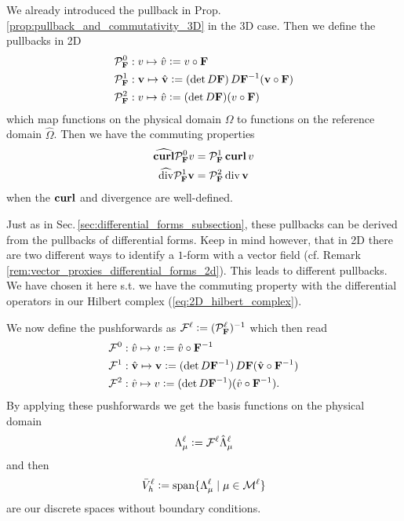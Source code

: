 \documentclass[../master_thesis.tex]{subfiles}
\begin{document}
We already introduced the pullback in Prop.\,\ref{prop:pullback_and_commutativity_3D} in the 3D case. 
Then we define the pullbacks in 2D
\begin{align*}
    &\mathcal{P}_\mathbf{F}^0: v \mapsto \hat{v} \vcentcolon= v \circ \mathbf{F}
    \\ &\mathcal{P}_\mathbf{F}^1: \mathbf{v} \mapsto \hat{\mathbf{v}} 
        \vcentcolon= (\det D\mathbf{F} )\,D\mathbf{F}^{-1} (\mathbf{v} \circ \mathbf{F})
    \\ &\mathcal{P}_\mathbf{F}^2: v \mapsto \hat{v} \vcentcolon= (\det D\mathbf{F}) (v\circ \mathbf{F})
\end{align*}
which map functions on the physical domain $\Omega$ to functions on the reference domain 
$\hat{\Omega}$. Then we have the commuting properties
\begin{align*}
    \widehat{\veccurl} \mathcal{P}_\mathbf{F}^0 v &= \mathcal{P}_\mathbf{F}^1 \veccurl v
    \\ \widehat{\diver} \mathcal{P}_\mathbf{F}^1 \mathbf{v} &= \mathcal{P}_\mathbf{F}^2 \diver \mathbf{v}
\end{align*}
when the $\veccurl$ and divergence are well-defined.
\begin{remark}
    Just as in Sec.\,\ref{sec:differential_forms_subsection}, 
    these pullbacks can be derived from the pullbacks of differential forms.
    Keep in mind however, that in 2D there are two different ways to identify a $1$-form 
    with a vector field (cf. Remark \ref{rem:vector_proxies_differential_forms_2d}). 
    This leads to different pullbacks. We have chosen it 
    here s.t. we have the commuting property with the differential operators in 
    our Hilbert complex (\ref{eq:2D_hilbert_complex}).
\end{remark}

We now define the pushforwards as 
$\mathcal{F}^\ell \vcentcolon= (\mathcal{P}_\mathbf{F}^\ell)^{-1}$ 
which then read
\begin{align*}
    &\mathcal{F}^0:  \hat{v}\mapsto v  \vcentcolon= \hat{v} \circ \mathbf{F}^{-1}
    \\ &\mathcal{F}^1: \hat{\mathbf{v}}  \mapsto \mathbf{v}
        \vcentcolon= (\det D\mathbf{F}^{-1}) \,D\mathbf{F} (\hat{\mathbf{v}} \circ \mathbf{F}^{-1})
    \\ &\mathcal{F}^2:  \hat{v} \mapsto  v\vcentcolon= (\det D\mathbf{F}^{-1}) (\hat{v}\circ \mathbf{F}^{-1}).
\end{align*}
By applying these pushforwards we get the basis functions on the physical domain
\begin{align*}
    \Lambda^\ell_{\mu} \vcentcolon= \mathcal{F}^\ell \hat{\Lambda}^\ell_{\mu}
\end{align*}
and then 
\begin{align*}
    \bar{V}_h^\ell \vcentcolon= \text{span} \{ \Lambda^\ell_{\mu} \mid \mu \in \mathcal{M}^\ell \}
\end{align*}
are our discrete spaces without boundary conditions.
\end{document}
